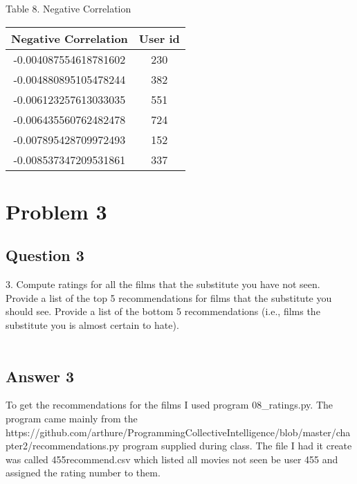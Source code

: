 \documentclass[10pt,letterpaper]{article}
\begin{document}
Table 8. Negative Correlation\\
\begin{center}
  \begin{tabular}{ | c | c }
    \hline
     Negative Correlation & User id\\ \hline
     -0.004087554618781602 & 230\\ \hline
     -0.004880895105478244 & 382\\ \hline
     -0.006123257613033035 & 551\\ \hline
     -0.006435560762482478 & 724\\ \hline
     -0.007895428709972493 & 152\\ \hline
     -0.008537347209531861 & 337\\ \hline
    \hline
  \end{tabular}
\end{center}

\pagebreak
\section{Problem 3}
\subsection{Question 3}
3.  Compute ratings for all the films that the substitute you have not seen.  Provide a list of the top 5 recommendations for films that the substitute you should see.  Provide a list of the bottom 5 recommendations (i.e., films the substitute you is almost certain to hate).\\
\\
\subsection{Answer 3}
To get the recommendations for the films I used program 08\_ratings.py.  The program came mainly from the https://github.com/arthur\-e/Programming\-Collective\-Intelligence/blob/master/chapter2/recommendations.py program supplied during class.  The file I had it create was called 455recommend.csv which listed all movies not seen be user 455 and assigned the rating number to them.\\
\end{document}
